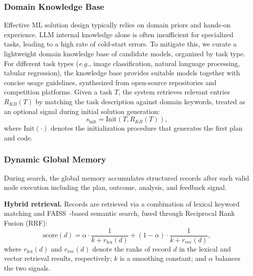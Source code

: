 \subsubsection{Domain Knowledge Base}
\label{sec:kb}

Effective ML solution design typically relies on domain priors and hands-on experience. LLM internal knowledge alone is often insufficient for specialized tasks, leading to a high rate of cold-start errors. To mitigate this, we curate a lightweight domain knowledge base of candidate models, organized by task type. For different task types (\textit{e.g.}, image classification, natural language processing, tabular regression), the knowledge base provides suitable models together with concise usage guidelines, synthesized from open-source repositories and competition platforms. Given a task $T$, the system retrieves relevant entries $R_{KB}(T)$ by matching the task description against domain keywords, treated as an optional signal during initial solution generation:
\begin{equation}
\label{eq:kb_init}
s_{\text{init}} = \mathrm{Init}(T, R_{KB}(T)),
\end{equation}
where $\mathrm{Init}(\cdot)$ denotes the initialization procedure that generates the first plan and code.


\subsubsection{Dynamic Global Memory}
\label{sec:global_memory}

During search, the global memory accumulates structured records after each valid node execution including the plan, outcome, analysis, and feedback signal.

\textbf{Hybrid retrieval.} Records are retrieved via a combination of lexical keyword matching and FAISS~\citep{johnson2019faiss}-based semantic search, fused through Reciprocal Rank Fusion (RRF):
\begin{equation}
\label{eq:rrf}
\text{score}(d) =
\alpha \cdot \frac{1}{k + r_{\text{lex}}(d)}
+ (1 - \alpha) \cdot \frac{1}{k + r_{\text{vec}}(d)},
\end{equation}
where $r_{\text{lex}}(d)$ and $r_{\text{vec}}(d)$ denote the ranks of record $d$ in the lexical and vector retrieval results, respectively; $k$ is a smoothing constant; and $\alpha$ balances the two signals.

